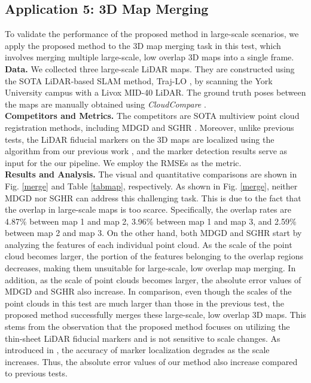 \subsection{Application 5: 3D Map Merging} \label{test5}
To validate the performance of the proposed method in large-scale scenarios, we apply the proposed method to the 3D map merging task in this test, which involves merging multiple large-scale, low overlap 3D maps into a single frame.
\\
\noindent\textbf{Data.} We collected three large-scale LiDAR maps. They are constructed using the SOTA LiDAR-based SLAM method, Traj-LO \cite{traj}, by scanning the York University campus with a Livox MID-40 LiDAR. The ground truth poses between the maps are manually obtained using \textit{CloudCompare} \cite{cloudcompare}. \\
\noindent\textbf{Competitors and Metrics.}
The competitors are SOTA multiview point cloud registration methods, including MDGD \cite{mdgd} and SGHR \cite{sghr}. Moreover, unlike previous tests, the LiDAR fiducial markers on the 3D maps are localized using the algorithm from our previous work \cite{mapmerge}, and the marker detection results serve as input for the our pipeline.
We employ the RMSEs as the metric.
\\
\noindent\textbf{Results and Analysis.}
The visual and quantitative comparisons are shown in Fig. \ref{merge} and Table \ref{tabmap}, respectively. As shown in Fig. \ref{merge}, neither MDGD nor SGHR can address this challenging task. This is due to the fact that the overlap in large-scale maps is too scarce. Specifically, the overlap rates \cite{pre} are 4.87\% between map 1 and map 2, 3.96\% between map 1 and map 3, and 2.59\% between map 2 and map 3. On the other hand, both MDGD and SGHR start by analyzing the features of each individual point cloud. As the scale of the point cloud becomes larger, the portion of the features belonging to the overlap regions decreases, making them unsuitable for large-scale, low overlap map merging. In addition, as the scale of point clouds becomes larger, the absolute error values of MDGD and SGHR also increase. In comparison, even though the scales of the point clouds in this test are much larger than those in the previous test, the proposed method successfully merges these large-scale, low overlap 3D maps. This stems from the observation that the proposed method focuses on utilizing the thin-sheet LiDAR fiducial markers and is not sensitive to scale changes. As introduced in \cite{mapmerge}, the accuracy of marker localization degrades as the scale increases. Thus, the absolute error values of our method also increase compared to previous tests.
